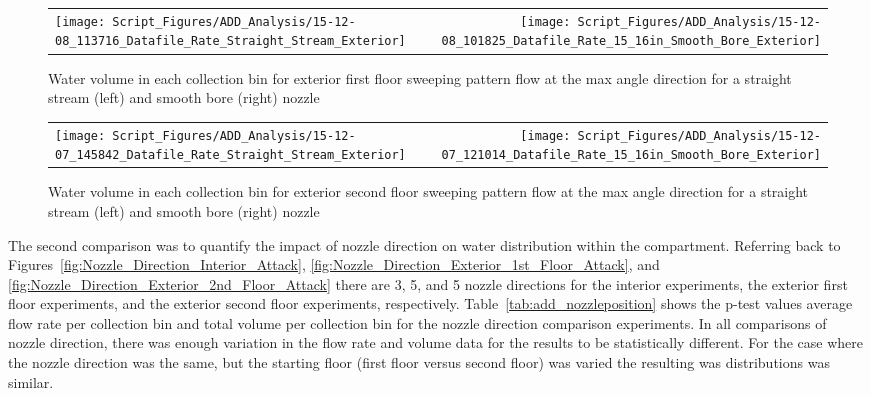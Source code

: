 \documentclass{book}
\begin{document}
\begin{figure}[ht]
\begin{tabular*}{\textwidth}{lr}
\texttt{[image: Script\_Figures/ADD\_Analysis/15-12-08\_113716\_Datafile\_Rate\_Straight\_Stream\_Exterior]} &
\texttt{[image: Script\_Figures/ADD\_Analysis/15-12-08\_101825\_Datafile\_Rate\_15\_16in\_Smooth\_Bore\_Exterior]}
\end{tabular*}
\caption{Water volume in each collection bin for exterior first floor sweeping pattern flow at the max angle direction for a straight stream (left) and smooth bore (right) nozzle}
\label{fig:Exterior_FirstFloor_O_Varying_Nozzle}
\end{figure}


\begin{figure}[ht]
\begin{tabular*}{\textwidth}{lr}
\texttt{[image: Script\_Figures/ADD\_Analysis/15-12-07\_145842\_Datafile\_Rate\_Straight\_Stream\_Exterior]} &
\texttt{[image: Script\_Figures/ADD\_Analysis/15-12-07\_121014\_Datafile\_Rate\_15\_16in\_Smooth\_Bore\_Exterior]}
\end{tabular*}
\caption{Water volume in each collection bin for exterior second floor sweeping pattern flow at the max angle direction for a straight stream (left) and smooth bore (right) nozzle}
\label{fig:Exterior_SecondFloor_O_Varying_Nozzle}
\end{figure}


\clearpage


The second comparison was to quantify the impact of nozzle direction on water distribution within the compartment. Referring back to Figures~\ref{fig:Nozzle_Direction_Interior_Attack}, \ref{fig:Nozzle_Direction_Exterior_1st_Floor_Attack}, and \ref{fig:Nozzle_Direction_Exterior_2nd_Floor_Attack} there are 3, 5, and 5 nozzle directions for the interior experiments, the exterior first floor experiments, and the exterior second floor experiments, respectively. Table~\ref{tab:add_nozzleposition} shows the p-test values average flow rate per collection bin and total volume per collection bin for the nozzle direction comparison experiments. In all comparisons of nozzle direction, there was enough variation in the flow rate and volume data for the results to be statistically different. For the case where the nozzle direction was the same, but the starting floor (first floor versus second floor) was varied the resulting was distributions was similar.
\end{document}
